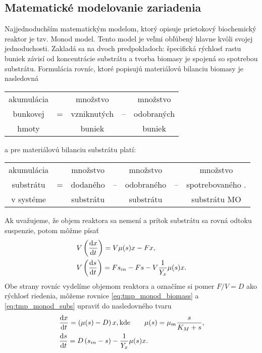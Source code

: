 \subsection{Matematické modelovanie zariadenia}
Najjednoduchším matematickým modelom, ktorý opisuje prietokový biochemický reaktor je tzv. Monod model. Tento model je veľmi obľúbený hlavne kvôli svojej jednoduchosti. Zakladá sa na dvoch predpokladoch:  špecifická rýchlosť rastu buniek závisí od koncentrácie substrátu a  tvorba biomasy je spojená so spotrebou substrátu. Formulácia rovníc, ktoré popisujú materiálovú bilanciu biomasy je nasledovná
\begin{table}[H]
	\centering
	\begin{tabular}{ccccc}
		akumulácia & & množstvo & & množstvo \\
		bunkovej & = & vzniknutých & -- & odobraných \\
		hmoty & & buniek & & buniek \\
	\end{tabular}
\end{table}
a pre materiálovú bilanciu substrátu platí:
\begin{table}[H]
	\centering
	\begin{tabular}{ccccccc}
		akumulácia & & množstvo & & množstvo & & množstvo\\
		substrátu & = & dodaného & -- & odobraného & -- & spotrebovaného .\\
		v systéme & & substrátu & & substrátu & & substrátu MO\\
	\end{tabular}
\end{table}
Ak uvažujeme, že objem reaktora sa nemení a prítok substrátu sa rovná odtoku suspenzie, potom môžme písať
\begin{align}
	&V\left(\frac{\text{d}x}{\text{d}t}\right) = V\mu(s)x - Fx, \label{eq:tmp_monod_biomass} \\
	&V\left(\frac{\text{d}s}{\text{d}t}\right) = Fs_{in} - Fs - V\frac{1}{Y_{x}}\mu(s)x. \label{eq:tmp_monod_subs}
\end{align}
Obe strany rovníc vydelíme objemom reaktora a označíme si pomer $ F/V = D $ ako rýchlosť riedenia, môžeme rovnice \eqref{eq:tmp_monod_biomass} a \eqref{eq:tmp_monod_subs} upraviť do nasledovného tvaru
\begin{align} 
	&\frac{\text{d}x}{\text{d}t} = \left(\mu(s) - D\right)x, \text{kde}  \qquad \mu(s) = \mu_{m}\frac{s}{K_{M} + s}, \label{eq:monod_biomas}\\
	&\frac{\text{d}s}{\text{d}t} = D\left(s_{in} - s\right) - \frac{1}{Y_{x}}\mu(s)x. \label{eq:monod_subs}
\end{align}

